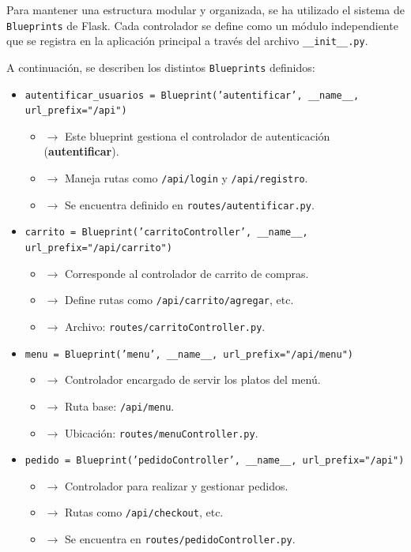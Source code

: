 \documentclass[10pt]{book}
\begin{document}
Para mantener una estructura modular y organizada, se ha utilizado el sistema de \texttt{Blueprints} de Flask. Cada controlador se define como un módulo independiente que se registra en la aplicación principal a través del archivo \texttt{\_\_init\_\_.py}.

A continuación, se describen los distintos \texttt{Blueprints} definidos:

\begin{itemize}
    \item \texttt{autentificar\_usuarios = Blueprint('autentificar', \_\_name\_\_, url\_prefix="/api")}
    \begin{itemize}
        \item $\rightarrow$ Este blueprint gestiona el controlador de autenticación (\textbf{autentificar}).
        \item $\rightarrow$ Maneja rutas como \texttt{/api/login} y \texttt{/api/registro}.
        \item $\rightarrow$ Se encuentra definido en \texttt{routes/autentificar.py}.
    \end{itemize}

    \item \texttt{carrito = Blueprint('carritoController', \_\_name\_\_, url\_prefix="/api/carrito")}
    \begin{itemize}
        \item $\rightarrow$ Corresponde al controlador de carrito de compras.
        \item $\rightarrow$ Define rutas como \texttt{/api/carrito/agregar}, etc.
        \item $\rightarrow$ Archivo: \texttt{routes/carritoController.py}.
    \end{itemize}

    \item \texttt{menu = Blueprint('menu', \_\_name\_\_, url\_prefix="/api/menu")}
    \begin{itemize}
        \item $\rightarrow$ Controlador encargado de servir los platos del menú.
        \item $\rightarrow$ Ruta base: \texttt{/api/menu}.
        \item $\rightarrow$ Ubicación: \texttt{routes/menuController.py}.
    \end{itemize}

    \item \texttt{pedido = Blueprint('pedidoController', \_\_name\_\_, url\_prefix="/api")}
    \begin{itemize}
        \item $\rightarrow$ Controlador para realizar y gestionar pedidos.
        \item $\rightarrow$ Rutas como \texttt{/api/checkout}, etc.
        \item $\rightarrow$ Se encuentra en \texttt{routes/pedidoController.py}.
    \end{itemize}


\end{itemize}
\end{document}
